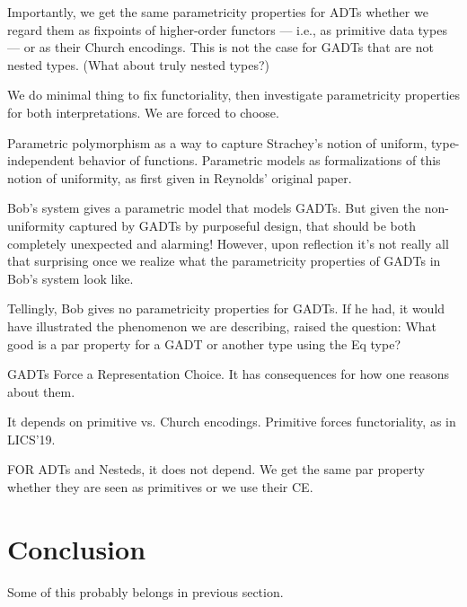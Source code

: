\documentclass[acmsmall,screen,review,anonymous]{acmart}
\theoremstyle{definition}
\begin{document}
Importantly, we get the same parametricity properties for ADTs whether
we regard them as fixpoints of higher-order functors --- i.e., as
primitive data types --- or as their Church encodings. This is not the
case for GADTs that are not nested types. (What about truly nested
types?)

We do minimal thing to fix functoriality, then investigate
parametricity properties for both interpretations. We are forced to
choose. 

Parametric polymorphism as a way to capture Strachey's notion of
uniform, type-independent behavior of functions. Parametric models as
formalizations of this notion of uniformity, as first given in
Reynolds' original paper.


Bob's system gives a parametric model that models GADTs. But given the
non-uniformity captured by GADTs by purposeful design, that should be
both completely unexpected and alarming! However, upon reflection it's
not really all that surprising once we realize what the parametricity
properties of GADTs in Bob's system look like.


Tellingly, Bob gives no parametricity properties for GADTs. If he had,
it would have illustrated the phenomenon we are describing, raised the
question: What good is a par property for a GADT or another type using
the Eq type?




GADTs Force a Representation Choice. It has consequences for how one
reasons about them.

It depends on primitive vs. Church encodings. Primitive forces
functoriality, as in LICS'19.

FOR ADTs and Nesteds, it does not depend. We get the same par property
whether they are seen as primitives or we use their CE.



\section{Conclusion}

{\color{blue} Some of this probably belongs in previous section.}
\end{document}
